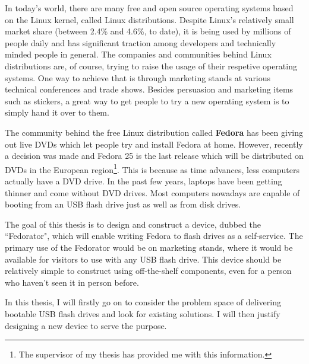 \label{Introduction}
    In today's world, there are many free and open source operating systems based on the Linux kernel, called Linux distributions\cite{whatislinux}.  Despite Linux's relatively small market share (between 2.4\% and 4.6\%, to date\cite{linuxmarketshare}), it is being used by millions of people daily and has significant traction among developers\cite{sosurvey} and technically minded people in general.  The companies and communities behind Linux distributions are, of course, trying to raise the usage of their respetive operating systems.  One way to achieve that is through marketing stands at various technical conferences and trade shows.  Besides persuasion and marketing items such as stickers, a great way to get people to try a new operating system is to simply hand it over to them.

    The community behind the free Linux distribution called \textbf{Fedora}\cite{fedora} has been giving out live DVDs which let people try and install Fedora at home.  However, recently a decision was made and Fedora 25 is the last release which will be distributed on DVDs in the European region\footnote{The supervisor of my thesis has provided me with this information.}.  This is because as time advances, less computers actually have a DVD drive.  In the past few years, laptops have been getting thinner and come without DVD drives\cite{laptopdvd}.  Most computers nowadays are capable of booting from an USB flash drive just as well as from disk drives\cite{fedora-how-to-live-usb}.
    
    The goal of this thesis is to design and construct a device, dubbed the ``Fedorator", which will enable writing Fedora to flash drives as a self-service.  The primary use of the Fedorator would be on marketing stands, where it would be available for visitors to use with any USB flash drive.  This device should be relatively simple to construct using off-the-shelf components, even for a person who haven't seen it in person before.
    
    In this thesis, I will firstly go on to consider the problem space of delivering bootable USB flash drives and look for existing solutions.  I will then justify designing a new device to serve the purpose.
